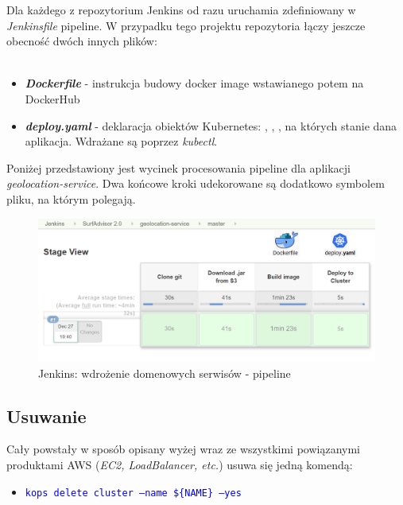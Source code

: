 Dla każdego z repozytorium Jenkins od razu uruchamia zdefiniowany w \emph{Jenkinsfile} pipeline.
W przypadku tego projektu repozytoria łączy jeszcze obecność dwóch innych plików:
\\\\
\begin{itemize}
    \item
    \emph{\textbf{Dockerfile}} - instrukcja budowy docker image wstawianego potem na DockerHub
    \item
    \emph{\textbf{deploy.yaml}} - deklaracja obiektów Kubernetes: , , , na których stanie dana aplikacja.
    Wdrażane są poprzez \emph{kubectl}.
\end{itemize} 

Poniżej przedstawiony jest wycinek procesowania pipeline dla aplikacji \emph{geolocation-service}.
Dwa końcowe kroki udekorowane są dodatkowo symbolem pliku, na którym polegają.

\begin{figure}[!ht]
	\begin{center}
		\includegraphics[width=1\textwidth]{img/jenkins-geo-stages}
	\end{center}
	\caption{Jenkins: wdrożenie domenowych serwisów - pipeline}
\end{figure}

\subsection{Usuwanie}

Cały powstały w sposób opisany wyżej  wraz ze wszystkimi powiązanymi produktami AWS (\emph{EC2, LoadBalancer, etc.}) usuwa się jedną komendą:

\begin{itemize}
    \item
    \textcolor{blue}{\texttt{kops delete cluster --name \$\{NAME\} --yes}}
\end{itemize} 


